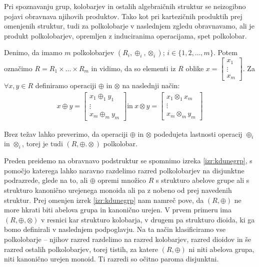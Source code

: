 \documentclass[mat1]{fmfdelo}
\begin{document}
Pri spoznavanju grup, kolobarjev in ostalih algebraičnih struktur se neizogibno pojavi obravnava njihovih produktov. Tako kot pri kartezičnih produktih prej omenjenih struktur, tudi za polkolobarje v naslednjem zgledu obravnavamo, ali je produkt polkolobarjev, opremljen z induciranima operacijama, spet polkolobar. 

\begin{zgled}
	\label{zgled:prodpolkolobar}
Denimo, da imamo $m$ polkolobarjev $(R_{i}, \oplus_{i}, \otimes_{i})$; $i\in \{1, 2, \ldots, m\}$. Potem označimo $R = R_1 \times \ldots \times R_m$ in vidimo, da so elementi iz $R$ oblike $x = \begin{bmatrix}
	x_1 \\
	\vdots \\
	x_m
\end{bmatrix}$. Za $\forall x, y\in R$ definiramo operaciji $\oplus$ in $\otimes$ na naslednji način:
\begin{align*}
	x \oplus y = \begin{bmatrix}
		x_1 \oplus_{1} y_1 \\
		\vdots \\
		x_m \oplus_{m} y_m
	\end{bmatrix} \text{in}~ x \otimes y = \begin{bmatrix}
		x_1 \otimes_{1} x_m \\
		\vdots \\
		x_m \otimes_{m} y_m
	\end{bmatrix}
\end{align*}

Brez težav lahko preverimo, da operaciji $\oplus$ in $\otimes$ podedujeta lastnosti operacij $\oplus_{i}$ in $\otimes_{i}$, torej je tudi $(R, \oplus. \otimes)$ polkolobar.
\end{zgled}

Preden preidemo na obravnavo podstruktur se spomnimo izreka \ref{izr:kdunegrp}, s pomočjo katerega lahko naravno razdelimo razred polkolobarjev na disjunktne podrazrede, glede na to, ali $\oplus$ opremi množico $R$ s strukturo abelove grupe ali s strukturo kanonično urejenega monoida ali pa z nobeno od prej navedenih struktur. Prej omenjen izrek \ref{izr:kdunegrp} nam namreč pove, da $(R, \oplus)$ ne more hkrati biti abelova grupa in kanonično urejen. V prvem primeru ima $(R, \oplus, \otimes)$ v resnici kar strukturo kolobarja, v drugem pa strukturo dioida, ki ga bomo definirali v naslednjem podpoglavju.
Na ta način klasificiramo vse polkolobarje -- njihov razred razdelimo na razred kolobarjev, razred dioidov in še razred ostalih polkolobarjev, torej tistih, za katere $(R, \oplus)$ ni niti abelova grupa, niti kanonično urejen monoid. Ti razredi so očitno paroma disjunktni.
\end{document}
